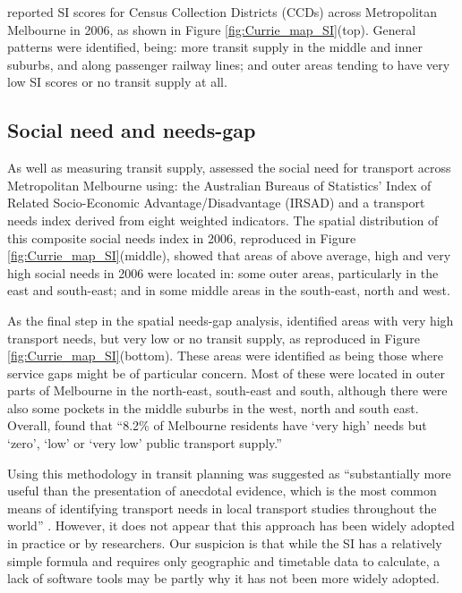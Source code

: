 \documentclass[preprint, 3p,
authoryear]{elsarticle} %
\begin{document}
\citet{currie2010identifying} reported SI scores for Census Collection
Districts (CCDs) across Metropolitan Melbourne in 2006, as shown in
Figure \ref{fig:Currie_map_SI}(top). General patterns were identified,
being: more transit supply in the middle and inner suburbs, and along
passenger railway lines; and outer areas tending to have very low SI
scores or no transit supply at all.

\hypertarget{social-need-and-needs-gap}{%
\subsection{Social need and needs-gap}\label{social-need-and-needs-gap}}

As well as measuring transit supply, \citet{currie2010identifying}
assessed the social need for transport across Metropolitan Melbourne
using: the Australian Bureaus of Statistics' Index of Related
Socio-Economic Advantage/Disadvantage (IRSAD) and a transport needs
index derived from eight weighted indicators. The spatial distribution
of this composite social needs index in 2006, reproduced in Figure
\ref{fig:Currie_map_SI}(middle), showed that areas of above average,
high and very high social needs in 2006 were located in: some outer
areas, particularly in the east and south-east; and in some middle areas
in the south-east, north and west.

As the final step in the spatial needs-gap analysis,
\citet{currie2010identifying} identified areas with very high transport
needs, but very low or no transit supply, as reproduced in Figure
\ref{fig:Currie_map_SI}(bottom). These areas were identified as being
those where service gaps might be of particular concern. Most of these
were located in outer parts of Melbourne in the north-east, south-east
and south, although there were also some pockets in the middle suburbs
in the west, north and south east. Overall,
\citet{currie2010identifying} found that ``8.2\% of Melbourne residents
have `very high' needs but `zero', `low' or `very low' public transport
supply.''

Using this methodology in transit planning was suggested as
``substantially more useful than the presentation of anecdotal evidence,
which is the most common means of identifying transport needs in local
transport studies throughout the world'' \citep{currie2010identifying}.
However, it does not appear that this approach has been widely adopted
in practice or by researchers. Our suspicion is that while the SI has a
relatively simple formula and requires only geographic and timetable
data to calculate, a lack of software tools may be partly why it has not
been more widely adopted.
\end{document}
